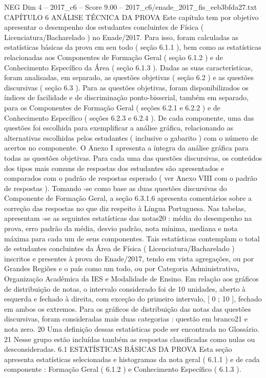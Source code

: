 \begin{textsample}{NEG Dim 4 – 2017\_c6 – Score 9.00 – 2017\_c6/enade\_2017\_fis\_eeb3bfda27.txt}  \label{ex:f4_neg_327}
CAPÍTULO 6 ANÁLISE TÉCNICA DA PROVA Este capítulo tem por objetivo apresentar o desempenho dos estudantes concluintes de Física ( Licenciatura/Bacharelado ) no Enade/2017.
Para isso, foram calculadas as estatísticas básicas da prova em seu todo ( seção 6.1.1 ), bem como as estatísticas relacionadas aos Componentes de Formação Geral ( seção 6.1.2 ) e de Conhecimento Específico da Área ( seção 6.1.3 ).
Dadas as suas características, foram analisadas, em separado, as questões objetivas ( seção 6.2 ) e as questões discursivas ( seção 6.3 ).
Para as questões objetivas, foram disponibilizados os índices de facilidade e de discriminação ponto-bisserial, também em separado, para os Componentes de Formação Geral ( seções 6.2.1 e 6.2.2 ) e de Conhecimento Específico ( seções 6.2.3 e 6.2.4 ).
De cada componente, uma das questões foi escolhida para exemplificar a análise gráfica, relacionando as alternativas escolhidas pelos estudantes ( inclusive o gabarito ) com o número de acertos no componente.
O Anexo I apresenta a íntegra da análise gráfica para todas as questões objetivas.
Para cada uma das questões discursivas, os conteúdos dos tipos mais comuns de respostas dos estudantes são apresentados e comparados com o padrão de respostas esperado ( ver Anexo VIII com o padrão de respostas ).
Tomando -se como base as duas questões discursivas do Componente de Formação Geral, a seção 6.3.1.6 apresenta comentários sobre a correção das respostas no que diz respeito à Língua Portuguesa.
Nas tabelas, apresentam -se as seguintes estatísticas das notas20 : média do desempenho na prova, erro padrão da média, desvio padrão, nota mínima, mediana e nota máxima para cada um de seus componentes.
Tais estatísticas contemplam o total de estudantes concluintes da Área de Física ( Licenciatura/Bacharelado ) inscritos e presentes à prova do Enade/2017, tendo em vista agregações, ou por Grandes Regiões e o país como um todo, ou por Categoria Administrativa, Organização Acadêmica da IES e Modalidade de Ensino.
Em relação aos gráficos de distribuição de notas, o intervalo considerado foi de 10 unidades, aberto à esquerda e fechado à direita, com exceção do primeiro intervalo, [ 0 ; 10 ], fechado em ambos os extremos.
Para os gráficos de distribuição das notas das questões discursivas, foram consideradas mais duas categorias : questão em branco21 e nota zero. 20 Uma definição dessas estatísticas pode ser encontrada no Glossário. 21 Nesse grupo estão incluídas também as respostas classificadas como nulas ou desconsideradas. 6.1 ESTATÍSTICAS BÁSICAS DA PROVA Esta seção apresenta estatísticas selecionadas e histogramas da nota geral ( 6.1.1 ) e de cada componente : Formação Geral ( 6.1.2 ) e Conhecimento Específico ( 6.1.3 ).

\end{textsample}
